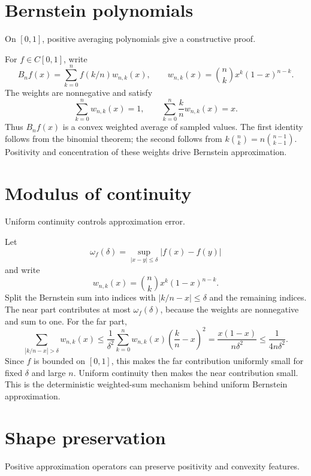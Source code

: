 \section{Bernstein polynomials}
On $[0,1]$, positive averaging polynomials give a constructive proof.


\begin{example}\label{ex:ii21-expand-01}
For $f\in C[0,1]$, write
\[
B_nf(x)=\sum_{k=0}^n f(k/n)w_{n,k}(x),
\qquad
w_{n,k}(x)=\binom nkx^k(1-x)^{n-k}.
\]
The weights are nonnegative and satisfy
\[
\sum_{k=0}^n w_{n,k}(x)=1,
\qquad
\sum_{k=0}^n \frac{k}{n}w_{n,k}(x)=x.
\]
Thus $B_nf(x)$ is a convex weighted average of sampled values. The first identity follows from the binomial theorem; the second follows from $k\binom nk=n\binom{n-1}{k-1}$. Positivity and concentration of these weights drive Bernstein approximation.
\end{example}
\section{Modulus of continuity}
Uniform continuity controls approximation error.


\begin{example}\label{ex:ii21-expand-02}
Let
\[
\omega_f(\delta)=\sup_{|x-y|\le\delta}|f(x)-f(y)|
\]
and write
\[
w_{n,k}(x)=\binom nkx^k(1-x)^{n-k}.
\]
Split the Bernstein sum into indices with \(|k/n-x|\le\delta\) and the remaining
indices. The near part contributes at most \(\omega_f(\delta)\), because the
weights are nonnegative and sum to one. For the far part,
\[
\sum_{|k/n-x|>\delta}w_{n,k}(x)
\le
\frac1{\delta^2}
\sum_{k=0}^n w_{n,k}(x)\left(\frac{k}{n}-x\right)^2
=
\frac{x(1-x)}{n\delta^2}
\le\frac1{4n\delta^2}.
\]
Since \(f\) is bounded on \([0,1]\), this makes the far contribution uniformly
small for fixed \(\delta\) and large \(n\). Uniform continuity then makes the
near contribution small. This is the deterministic weighted-sum mechanism
behind uniform Bernstein approximation.
\end{example}
\section{Shape preservation}
Positive approximation operators can preserve positivity and convexity features.

